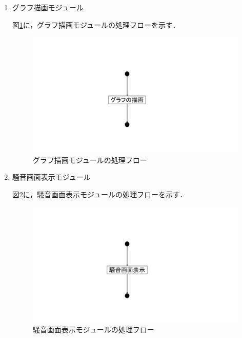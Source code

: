 \begin{enumerate}
\item グラフ描画モジュール

図\ref{fig;1-5}に，グラフ描画モジュールの処理フローを示す．

\begin{figure}[H]
	\begin{center}
	\includegraphics[width=15cm, bb=0 0 1000 540, clip]{./app_pic/app1-5.pdf}
	\caption{グラフ描画モジュールの処理フロー}
	\label{fig;1-5}
	\end{center}
\end{figure}

\item 騒音画面表示モジュール

図\ref{fig;1-6}に，騒音画面表示モジュールの処理フローを示す．

\begin{figure}[H]
	\begin{center}
	\includegraphics[width=15cm, bb=0 0 1000 540, clip]{./app_pic/app1-6.pdf}
	\caption{騒音画面表示モジュールの処理フロー}
	\label{fig;1-6}
	\end{center}
\end{figure}

\end{enumerate}

